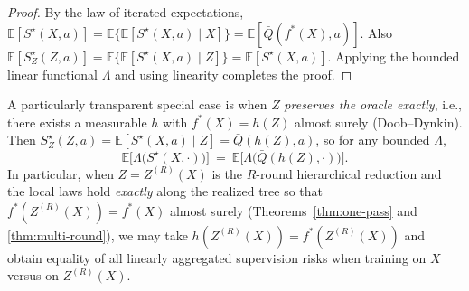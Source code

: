 \documentclass[11pt]{article}
\newcommand{\Y}{\mathcal{Y}}               %
\newcommand{\fstar}{f^*}               %
\newcommand{\sstar}{S^\star}               %
\newcommand{\E}{\mathbb{E}}
\newcommand{\metric}{d_{\Y}}
\begin{document}
\begin{proof}
By the law of iterated expectations,
$\E[\sstar(X,a)]=\E\{\E[\sstar(X,a)\mid X]\}=\E[\bar Q(\fstar(X),a)]$.
Also $\E[\sstar_Z(Z,a)]=\E\{\E[\sstar(X,a)\mid Z]\}=\E[\sstar(X,a)]$.
Applying the bounded linear functional $\Lambda$ and using linearity completes the proof.
\end{proof}

A particularly transparent special case is when $Z$ \emph{preserves the oracle exactly}, i.e., there exists a measurable $h$ with $\fstar(X)=h(Z)$ almost surely (Doob–Dynkin). Then
$\sstar_Z(Z,a)=\E[\sstar(X,a)\mid Z]=\bar Q(h(Z),a)$, so for any bounded $\Lambda$,
\[
\E\!\big[\Lambda\big(\sstar(X,\cdot)\big)\big]\ =\ \E\!\big[\Lambda\big(\bar Q(h(Z),\cdot)\big)\big].
\]
In particular, when $Z=Z^{(R)}(X)$ is the $R$-round hierarchical reduction and the local laws hold \emph{exactly} along the realized tree so that $\fstar(Z^{(R)}(X))=\fstar(X)$ almost surely (Theorems~\ref{thm:one-pass} and \ref{thm:multi-round}), we may take $h(Z^{(R)}(X))=\fstar(Z^{(R)}(X))$ and obtain equality of all linearly aggregated supervision risks when training on $X$ versus on $Z^{(R)}(X)$.



\end{document}
